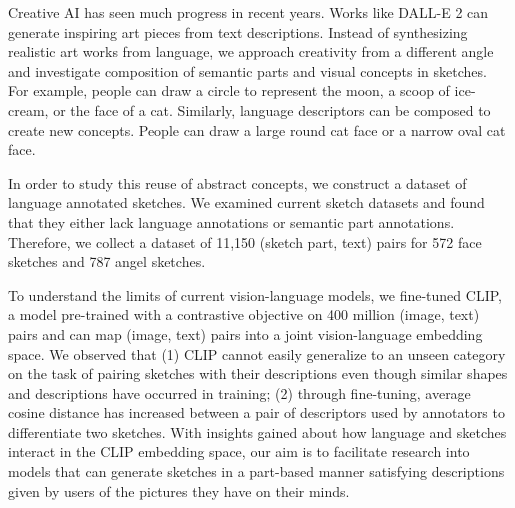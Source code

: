 Creative AI has seen much progress in recent years. Works like DALL-E 2 can generate inspiring art pieces from text descriptions. Instead of synthesizing realistic art works from language, we approach creativity from a different angle and investigate composition of semantic parts and visual concepts in sketches. For example, people can draw a circle to represent the moon, a scoop of ice-cream, or the face of a cat. Similarly, language descriptors can be composed to create new concepts. People can draw a large round cat face or a narrow oval cat face. 

In order to study this reuse of abstract concepts, we construct a dataset of language annotated sketches.  We examined current sketch datasets and found that they either lack language annotations or semantic part annotations. Therefore, we collect a dataset of 11,150 (sketch part, text) pairs for 572 face sketches and 787 angel sketches. 

To understand the limits of current vision-language models, we fine-tuned CLIP,  a model pre-trained with a contrastive objective on 400 million (image, text) pairs and can map (image, text) pairs into a joint vision-language embedding space. We observed that (1) CLIP cannot easily generalize to an unseen category on the task of pairing sketches with their descriptions even though similar shapes and descriptions have occurred in training; (2) through fine-tuning, average cosine distance has increased between a pair of descriptors used by annotators to differentiate two sketches. With insights gained about how language and sketches interact in the CLIP embedding space, our aim is to facilitate research into models that can generate sketches in a part-based manner satisfying descriptions given by users of the pictures they have on their minds. 